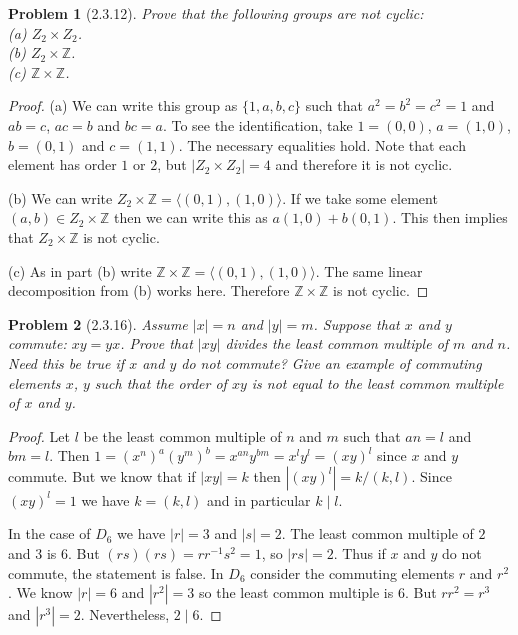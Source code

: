 \documentclass{article}
\newtheorem{problem}{Problem}
\begin{document}
\begin{problem}[2.3.12]
Prove that the following groups are \emph{not} cyclic:\\
(a) $Z_2 \times Z_2$.\\
(b) $Z_2 \times \mathbb{Z}$.\\
(c) $\mathbb{Z} \times \mathbb{Z}$.
\end{problem}
\begin{proof}
(a) We can write this group as $\{1,a,b,c\}$ such that $a^2 = b^2 = c^2 = 1$ and $ab = c$, $ac = b$ and $bc = a$. To see the identification, take $1 = (0,0)$, $a = (1,0)$, $b = (0,1)$ and $c = (1,1)$. The necessary equalities hold. Note that each element has order $1$ or $2$, but $|Z_2 \times Z_2| = 4$ and therefore it is not cyclic.

(b) We can write $Z_2 \times \mathbb{Z} = \langle (0,1), (1,0) \rangle$. If we take some element $(a,b) \in Z_2 \times \mathbb{Z}$ then we can write this as $a(1,0) + b(0,1)$. This then implies that $Z_2 \times \mathbb{Z}$ is not cyclic.

(c) As in part (b) write $\mathbb{Z} \times \mathbb{Z} = \langle (0,1), (1,0) \rangle$. The same linear decomposition from (b) works here. Therefore $\mathbb{Z} \times \mathbb{Z}$ is not cyclic.
\end{proof}

\begin{problem}[2.3.16]
Assume $|x| = n$ and $|y| = m$. Suppose that $x$ and $y$ commute: $xy = yx$. Prove that $|xy|$ divides the least common multiple of $m$ and $n$. Need this be true if $x$ and $y$ do \emph{not} commute? Give an example of commuting elements $x$, $y$ such that the order of $xy$ is not equal to the least common multiple of $x$ and $y$.
\end{problem}
\begin{proof}
Let $l$ be the least common multiple of $n$ and $m$ such that $an = l$ and $bm = l$. Then $1 = (x^n)^a (y^m)^b = x^{an} y^{bm} = x^l y^l = (xy)^l$ since $x$ and $y$ commute. But we know that if $|xy| = k$ then $|(xy)^l| = k/(k,l)$. Since $(xy)^l = 1$ we have $k = (k,l)$ and in particular $k \mid l$.

In the case of $D_6$ we have $|r| = 3$ and $|s| = 2$. The least common multiple of $2$ and $3$ is $6$. But $(rs)(rs) = rr^{-1}s^2 = 1$, so $|rs| = 2$. Thus if $x$ and $y$ do not commute, the statement is false. In $D_6$ consider the commuting elements $r$ and $r^2$. We know $|r| = 6$ and $|r^2| = 3$ so the least common multiple is $6$. But $rr^2 = r^3$ and $|r^3| = 2$. Nevertheless, $2 \mid 6$.
\end{proof}
\end{document}
